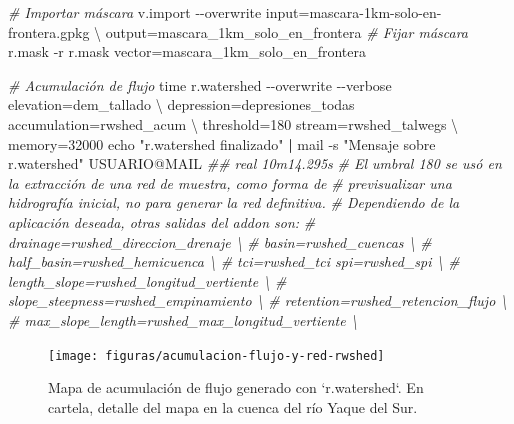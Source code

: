 \documentclass[spanish]{article}
\newenvironment{Shaded}{\begin{snugshade}}{\end{snugshade}}
\newcommand{\AttributeTok}[1]{\textcolor[rgb]{0.77,0.63,0.00}{#1}}
\newcommand{\BuiltInTok}[1]{#1}
\newcommand{\CommentTok}[1]{\textcolor[rgb]{0.56,0.35,0.01}{\textit{#1}}}
\newcommand{\DataTypeTok}[1]{\textcolor[rgb]{0.13,0.29,0.53}{#1}}
\newcommand{\ExtensionTok}[1]{#1}
\newcommand{\KeywordTok}[1]{\textcolor[rgb]{0.13,0.29,0.53}{\textbf{#1}}}
\newcommand{\NormalTok}[1]{#1}
\newcommand{\StringTok}[1]{\textcolor[rgb]{0.31,0.60,0.02}{#1}}
\begin{document}
\begin{Shaded}
\begin{Highlighting}[]
\CommentTok{\# Importar máscara}
\ExtensionTok{v.import} \AttributeTok{{-}{-}overwrite}\NormalTok{ input=mascara{-}1km{-}solo{-}en{-}frontera.gpkg }\DataTypeTok{\textbackslash{}}
\NormalTok{  output=mascara\_1km\_solo\_en\_frontera}
\CommentTok{\# Fijar máscara}
\ExtensionTok{r.mask} \AttributeTok{{-}r}
\ExtensionTok{r.mask}\NormalTok{ vector=mascara\_1km\_solo\_en\_frontera}

\CommentTok{\# Acumulación de flujo}
\BuiltInTok{time}\NormalTok{ r.watershed }\AttributeTok{{-}{-}overwrite} \AttributeTok{{-}{-}verbose}\NormalTok{ elevation=dem\_tallado }\DataTypeTok{\textbackslash{}}
\NormalTok{ depression=depresiones\_todas accumulation=rwshed\_acum }\DataTypeTok{\textbackslash{}}
\NormalTok{ threshold=180 stream=rwshed\_talwegs }\DataTypeTok{\textbackslash{}}
\NormalTok{ memory=32000}
\BuiltInTok{echo} \StringTok{"r.watershed finalizado"} \KeywordTok{|} \ExtensionTok{mail} \AttributeTok{{-}s} \StringTok{"Mensaje sobre r.watershed"}\NormalTok{ USUARIO@MAIL}
\CommentTok{\#\# real 10m14.295s}
\CommentTok{\# El umbral 180 se usó en la extracción de una red de muestra, como forma de}
\CommentTok{\# previsualizar una hidrografía inicial, no para generar la red definitiva.}
\CommentTok{\# Dependiendo de la aplicación deseada, otras salidas del addon son:}
\CommentTok{\# drainage=rwshed\_direccion\_drenaje \textbackslash{}}
\CommentTok{\# basin=rwshed\_cuencas \textbackslash{}}
\CommentTok{\# half\_basin=rwshed\_hemicuenca \textbackslash{}}
\CommentTok{\# tci=rwshed\_tci spi=rwshed\_spi \textbackslash{}}
\CommentTok{\# length\_slope=rwshed\_longitud\_vertiente \textbackslash{}}
\CommentTok{\# slope\_steepness=rwshed\_empinamiento \textbackslash{}}
\CommentTok{\# retention=rwshed\_retencion\_flujo \textbackslash{}}
\CommentTok{\# max\_slope\_length=rwshed\_max\_longitud\_vertiente \textbackslash{}}
\end{Highlighting}
\end{Shaded}

\begin{figure}

{\centering \texttt{[image: figuras/acumulacion-flujo-y-red-rwshed]} 

}

\caption{Mapa de acumulación de flujo generado con `r.watershed`. En cartela, detalle del mapa en la cuenca del río Yaque del Sur.}\label{fig:acumyredrwshed}
\end{figure}
\end{document}

